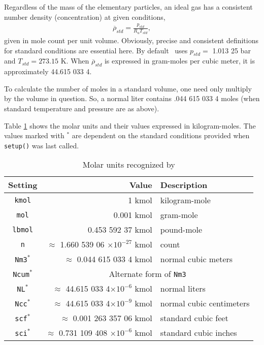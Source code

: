 Regardless of the mass of the elementary particles, an ideal gas has a consistent number density (concentration) at given conditions,
\begin{align}
\overline{\rho}_{std} = \frac{p_{std}}{R_u T_{std}},
\end{align}
given in mole count per unit volume.  Obviously, precise and consistent definitions for standard conditions are essential here.  By default \PM\ uses $p_{std} =$ 1.013 25 bar and $T_{std} = 273.15$ K.  When $\overline{\rho}_{std}$ is expressed in gram-moles per cubic meter, it is approximately 44.615 033 4.

To calculate the number of moles in a standard volume, one need only multiply by the volume in question.  So, a normal liter contains .044 615 033 4 moles (when standard temperature and pressure are as above).

Table \ref{tab:molar} shows the molar units and their values expressed in kilogram-moles.  The values marked with $^*$ are dependent on the standard conditions provided when \verb|setup()| was last called.

\begin{table}
\centering
\caption{Molar units recognized by \PM}\label{tab:molar}
\begin{tabular}{crl}
\hline
Setting & Value & Description\\
\hline
\verb|kmol| & 1 kmol & kilogram-mole\\
\verb|mol| & 0.001 kmol & gram-mole\\
\verb|lbmol| & 0.453 592 37 kmol & pound-mole\\
\verb|n| & $\approx$ 1.660 539 06 $\times 10^{-27}$ kmol & count \\
\verb|Nm3|$^*$ & $\approx$ 0.044 615 033 4 kmol & normal cubic meters\\
\verb|Ncum|$^*$ & \multicolumn{2}{c}{Alternate form of \texttt{Nm3}}\\
\verb|NL|$^*$ & $\approx$ 44.615 033 4$\times 10^{-6}$ kmol & normal liters\\
\verb|Ncc|$^*$ & $\approx$ 44.615 033 4$\times 10^{-9}$ kmol & normal cubic centimeters\\
\verb|scf|$^*$ & $\approx$ 0.001 263 357 06 kmol & standard cubic feet\\
\verb|sci|$^*$ & $\approx$ 0.731 109 408 $\times 10^{-6}$ kmol & standard cubic inches\\
\hline
\end{tabular}
\end{table}

